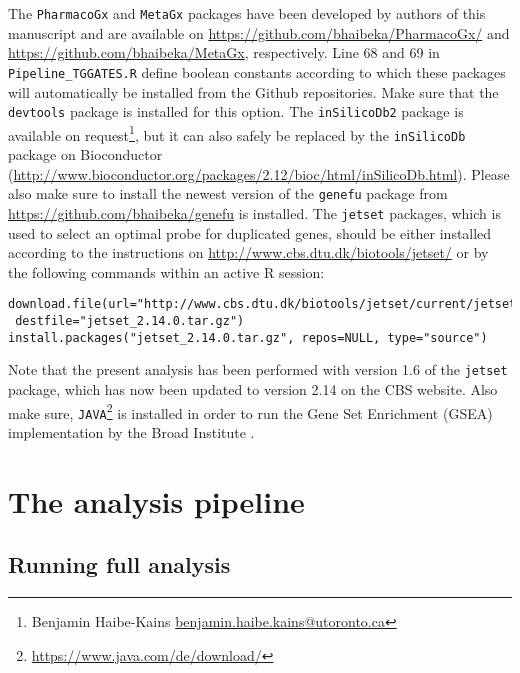 \documentclass[a4paper,10pt]{scrartcl}
\begin{document}
The \verb+PharmacoGx+ and \verb+MetaGx+ packages have been developed by authors of this manuscript and are available on \url{https://github.com/bhaibeka/PharmacoGx/} and \url{https://github.com/bhaibeka/MetaGx}, respectively. Line 68 and 69 in \verb+Pipeline_TGGATES.R+ define boolean constants according to which these packages will automatically be installed from the Github repositories. Make sure that the \verb+devtools+ package is installed for this option. The \verb+inSilicoDb2+ package is available on request\footnote{Benjamin Haibe-Kains \url{benjamin.haibe.kains@utoronto.ca}}, but it can also safely be replaced by the \verb+inSilicoDb+ package on Bioconductor (\url{http://www.bioconductor.org/packages/2.12/bioc/html/inSilicoDb.html}). Please also make sure to install the newest version of the \verb+genefu+ package from \url{https://github.com/bhaibeka/genefu} is installed. The \verb+jetset+ packages, which is used to select an optimal probe for duplicated genes, should be either installed according to 
the instructions on \url{http://www.cbs.dtu.dk/biotools/jetset/} or by the following commands within an active R session:

\begin{verbatim}
download.file(url="http://www.cbs.dtu.dk/biotools/jetset/current/jetset_2.14.0.tar.gz", 
 destfile="jetset_2.14.0.tar.gz")
install.packages("jetset_2.14.0.tar.gz", repos=NULL, type="source")
\end{verbatim}

Note that the present analysis has been performed with version 1.6 of the \verb+jetset+ package, which has now been updated to version 2.14 on the CBS website. Also make sure, \verb+JAVA+\footnote{\url{https://www.java.com/de/download/}} is installed in order to run the Gene Set Enrichment (GSEA) implementation by the Broad Institute \cite{Subramanian:2005:Proc-Natl-Acad-Sci-U-S-A:16199517}.

\section{The analysis pipeline}

\subsection{Running full analysis}
\end{document}
